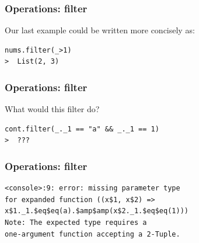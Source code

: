\documentclass{beamer}
\begin{document}
\begin{frame}[fragile]
  \frametitle{Operations: filter}
  
\Large Our last example could be written more concisely as:

\vfill

\begin{lstlisting}[linebackgroundcolor={\btLstHL<1>{1}},basicstyle=\ttfamily\Large]
nums.filter(_>1) 
>  List(2, 3)
\end{lstlisting}

\end{frame}

\begin{frame}[fragile]
  \frametitle{Operations: filter}
  
\Large What would this filter do?

\vfill

\begin{lstlisting}[basicstyle=\ttfamily\Large,linebackgroundcolor={\btLstHL<1>{1}}]
cont.filter(_._1 == "a" && _._1 == 1) 
>  ???
\end{lstlisting}

\end{frame}

\begin{frame}[fragile]
  \frametitle{Operations: filter}
  

\begin{lstlisting}[basicstyle=\ttfamily\normalsize,language={}]
<console>:9: error: missing parameter type
for expanded function ((x$1, x$2) =>
x$1._1.$eq$eq(a).$amp$amp(x$2._1.$eq$eq(1)))
Note: The expected type requires a
one-argument function accepting a 2-Tuple.
\end{lstlisting}
\end{frame}

{
  \pagecolor{black}

\begin{frame}[plain]
\end{frame}
}
\end{document}
